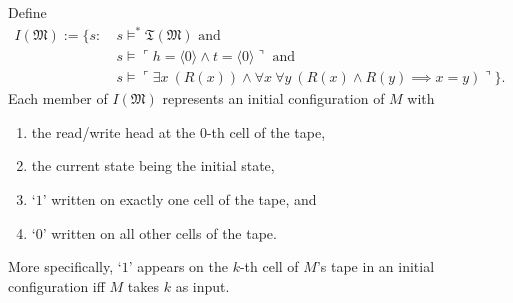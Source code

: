 \documentclass[12pt]{article}
\numberwithin{equation}{section}
\begin{document}
\begin{ex}
Define 
\begin{align*}
    I(\mathfrak{M}) := \{s : \ & s \models^* \mathfrak{T}(\mathfrak{M}) \text{ and } \\
    & s \models \ulcorner h = \langle 0 \rangle \wedge t = \langle 0 \rangle \urcorner \text{ and } \\
    & s \models \ulcorner \exists x \ (R(x)) \wedge \forall x \ \forall y \ (R(x) \wedge R(y) \implies x = y) \urcorner\} \text{.}
\end{align*}
Each member of $I(\mathfrak{M})$ represents an initial configuration of $M$ with \begin{enumerate}[label=(\alph*)]
    \item the read/write head at the $0$-th cell of the tape, 
    \item the current state being the initial state, 
    \item `$1$' written on exactly one cell of the tape, and
    \item `$0$' written on all other cells of the tape.
\end{enumerate} 
More specifically, `$1$' appears on the $k$-th cell of $M$'s tape in an initial configuration iff $M$ takes $k$ as input.


\end{ex}
\end{document}
